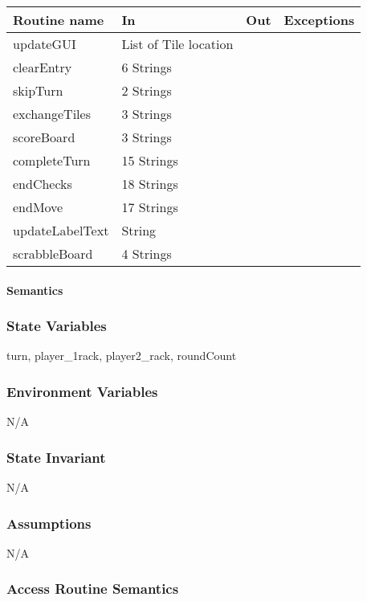 \documentclass[12pt]{article}
\begin{document}
\begin{tabular}{| l | l | l | l |}
\hline
\textbf{Routine name} & \textbf{In} & \textbf{Out} & \textbf{Exceptions}\\
\hline
updateGUI & List of Tile location & & \\
\hline
clearEntry & 6 Strings &  & \\
\hline
skipTurn & 2 Strings & & \\
\hline
exchangeTiles & 3 Strings & & \\
\hline
scoreBoard & 3 Strings & & \\
\hline
completeTurn & 15 Strings & & \\
\hline
endChecks & 18 Strings & & \\
\hline
endMove & 17 Strings & & \\
\hline
updateLabelText & String & & \\
\hline
scrabbleBoard & 4 Strings & & \\
\hline
\end{tabular}

\paragraph* {Semantics}

\subsubsection*{State Variables}

turn, player\_1rack, player2\_rack, roundCount

\subsubsection*{Environment Variables}

N/A

\subsubsection*{State Invariant}

N/A

\subsubsection*{Assumptions}

N/A

\subsubsection* {Access Routine Semantics}
\end{document}
